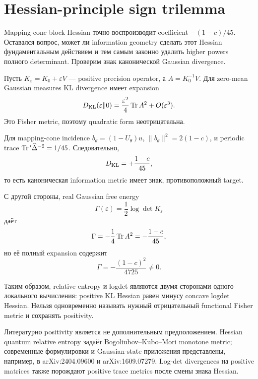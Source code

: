 \chapter{Hessian-principle sign trilemma}

Mapping-cone block Hessian точно воспроизводит coefficient
\(-(1-c)/45\). Оставался вопрос, может ли information geometry сделать этот
Hessian фундаментальным действием и тем самым законно удалить higher powers
полного determinant. Проверим знак канонической Gaussian divergence.

Пусть \(K_\varepsilon=K_0+\varepsilon V\) --- positive precision operator,
а \(A=K_0^{-1}V\). Для zero-mean Gaussian measures KL divergence имеет
expansion
\begin{equation}
 D_{\rm KL}(\varepsilon\|0)
 =\frac{\varepsilon^2}{4}\operatorname{Tr} A^2+O(\varepsilon^3).
 \label{eq:gaussian-kl-positive-hessian}
\end{equation}
Это Fisher metric, поэтому quadratic form неотрицательна.

Для mapping-cone incidence
\(b_\theta=(1-U_\theta)u\),
\(\|b_\theta\|^2=2(1-c)\), и periodic trace
\(\operatorname{Tr}{}'\widehat\Delta^{-2}=1/45\). Следовательно,
\begin{equation}
 [\varepsilon^2]D_{\rm KL}
 =+\frac{1-c}{45},
\end{equation}
то есть каноническая information metric имеет знак, противоположный target.

С другой стороны, real Gaussian free energy
\begin{equation}
 \Gamma(\varepsilon)=\frac12\log\det K_\varepsilon
\end{equation}
даёт
\begin{equation}
 [\varepsilon^2]\Gamma
 =-\frac14\Tr A^2
 =-\frac{1-c}{45},
\end{equation}
но её полный expansion содержит
\begin{equation}
 [\varepsilon^4]\Gamma
 =-\frac{(1-c)^2}{4725}\ne0.
\end{equation}

Таким образом, relative entropy и logdet являются двумя сторонами одного
локального вычисления: positive KL Hessian равен минусу concave logdet
Hessian. Нельзя одновременно называть нужный отрицательный functional
Fisher metric и сохранять positivity.

Литературно positivity является не дополнительным предположением. Hessian
quantum relative entropy задаёт Bogoliubov--Kubo--Mori monotone metric;
современные формулировки и Gaussian-state приложения представлены, например,
в arXiv:2404.09600 и arXiv:1609.07279. Log-det divergences на positive
matrices также порождают positive trace metrics после смены знака Hessian.

